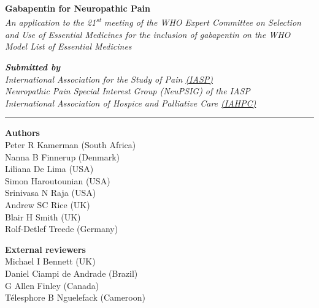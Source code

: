 \documentclass[11pt]{article}
\begin{document}
\thispagestyle{empty}

\begin{center}
\LARGE{\textbf{Gabapentin for Neuropathic Pain}}\\
\vspace{10mm}
\large{\textit{An application to the 21\textsuperscript{st} meeting of the WHO Expert Committee on Selection and Use of Essential Medicines for the inclusion of gabapentin on the WHO Model List of Essential Medicines}}\\

\vspace{10mm}

\normalsize{\textit{
\textbf{Submitted by}\\
International Association for the Study of Pain \href{http://www.iasp-pain.org}{(IASP)}
\\Neuropathic Pain Special Interest Group (NeuPSIG) of the IASP
\\ International Association of Hospice and Palliative Care \href{http://hospicecare.com/home/}{(IAHPC)}}}
\rule{0.5\textwidth}{.4pt}
\end{center}

\vspace{10mm}

\begin{minipage}[t]{0.6\textwidth} %
\textbf{Authors}\\
Peter R Kamerman (South Africa)\footnotemark \\
Nanna B Finnerup (Denmark)\\
Liliana De Lima (USA)\\
Simon Haroutounian (USA)\\
Srinivasa N Raja (USA)\\
Andrew SC Rice (UK)\\
Blair H Smith (UK)\\
Rolf-Detlef Treede (Germany)
\end{minipage}
\begin{minipage}[t]{0.5\textwidth}
\textbf{External reviewers}\\
Michael I Bennett (UK)\\
Daniel Ciampi de Andrade (Brazil)\\
G Allen Finley (Canada)\\
T\'{e}lesphore B Nguelefack (Cameroon)
\end{minipage}

\vspace{20mm}
\end{document}
